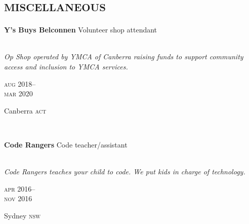 

\section*{\textsc{miscellaneous}}
\vspace{-0.2cm}

\begin{minipage}[t]{\mainboxwidth\textwidth}
\textbf{Y's Buys Belconnen}\phantom{..} Volunteer shop attendant\\
\\
{\small
\textit{Op Shop operated by YMCA of Canberra raising funds to support community access and inclusion to YMCA services.}
\par}
\end{minipage}
\begin{minipage}[t]{\detailboxwidth\textwidth}
{
\hfill \textsc{aug} 2018--\\ 
\hspace*{0pt} \hfill \textsc{mar} 2020
\par
{\small\hfill Canberra \textsc{act}}
}
\end{minipage}
\\

\begin{minipage}[t]{\mainboxwidth\textwidth}
\textbf{Code Rangers}\phantom{..} Code teacher/assistant \\
\\
{\small
\textit{Code Rangers teaches your child to code. We put kids in charge of technology.}
\par}
\end{minipage}
\begin{minipage}[t]{\detailboxwidth\textwidth}
{
\hfill \textsc{apr} 2016--\\ 
\hspace*{0pt} \hfill \textsc{nov} 2016
\par
{\small\hfill Sydney \textsc{nsw}}
}
\end{minipage}
\\

